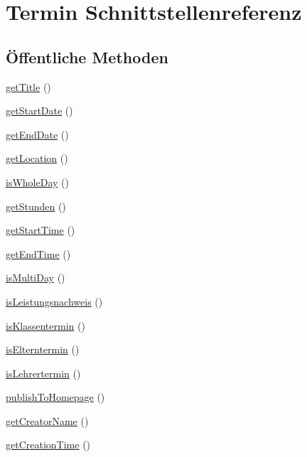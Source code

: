 \hypertarget{interface_termin}{}\section{Termin Schnittstellenreferenz}
\label{interface_termin}
\subsection*{Öffentliche Methoden}
\begin{DoxyCompactItemize}
\item 
\mbox{\hyperlink{interface_termin_a2fca19815ee61713254ac18782205feb}{get\+Title}} ()
\item 
\mbox{\hyperlink{interface_termin_a9ed1a03f1247bfa10a8e56f5fd8634cd}{get\+Start\+Date}} ()
\item 
\mbox{\hyperlink{interface_termin_afa0a9c0bb04251fde3dcd65e45ebec18}{get\+End\+Date}} ()
\item 
\mbox{\hyperlink{interface_termin_aeea92d8a1dccea73510e4c4b71a828c7}{get\+Location}} ()
\item 
\mbox{\hyperlink{interface_termin_aa603cfdfcdc2f480324d94adc2e846f5}{is\+Whole\+Day}} ()
\item 
\mbox{\hyperlink{interface_termin_a50c2f45c4958f1bb77c1606d5f7a0323}{get\+Stunden}} ()
\item 
\mbox{\hyperlink{interface_termin_a6421df2bc4f4e75c3b451e71ce104780}{get\+Start\+Time}} ()
\item 
\mbox{\hyperlink{interface_termin_a2c967074ee189a6e1fcf0a40cb71a4a4}{get\+End\+Time}} ()
\item 
\mbox{\hyperlink{interface_termin_a3ee9c6ae1bcd6424f57abaac24b7341b}{is\+Multi\+Day}} ()
\item 
\mbox{\hyperlink{interface_termin_a5e994b8b00058d167d82514053de3c88}{is\+Leistungsnachweis}} ()
\item 
\mbox{\hyperlink{interface_termin_aab8e358f66111c5075f20bd0938497f5}{is\+Klassentermin}} ()
\item 
\mbox{\hyperlink{interface_termin_a120ec73226cde99fbd20fbf8c2162604}{is\+Elterntermin}} ()
\item 
\mbox{\hyperlink{interface_termin_ab40fb4c2e09479bfe5749243f59246c1}{is\+Lehrertermin}} ()
\item 
\mbox{\hyperlink{interface_termin_a158a3cb7853407a73722ea80b5ef3e55}{publish\+To\+Homepage}} ()
\item 
\mbox{\hyperlink{interface_termin_a3c724598a080bd6ed8a997474ed32cdc}{get\+Creator\+Name}} ()
\item 
\mbox{\hyperlink{interface_termin_a14c16fb57c12e605e3eabefd640c7b71}{get\+Creation\+Time}} ()
\end{DoxyCompactItemize}
